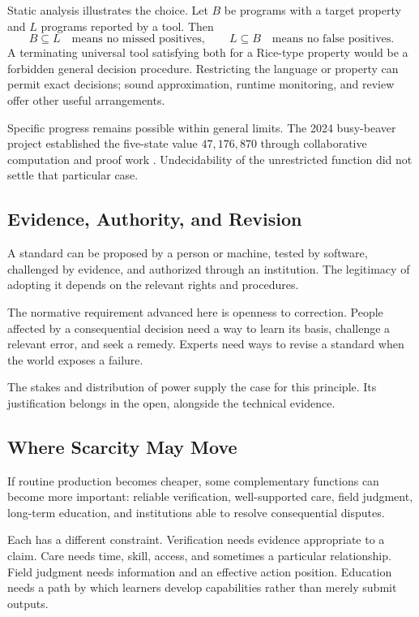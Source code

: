 \documentclass[11pt,openany]{book}
\begin{document}
Static analysis illustrates the choice. Let $B$ be programs with a target property and $L$ programs reported by a tool. Then
\begin{equation}
 B\subseteq L\quad\text{means no missed positives},
 \qquad
 L\subseteq B\quad\text{means no false positives}.
\end{equation}
A terminating universal tool satisfying both for a Rice-type property would be a forbidden general decision procedure. Restricting the language or property can permit exact decisions; sound approximation, runtime monitoring, and review offer other useful arrangements.

Specific progress remains possible within general limits. The 2024 busy-beaver project established the five-state value $47{,}176{,}870$ through collaborative computation and proof work \cite{bbchallenge2024}. Undecidability of the unrestricted function did not settle that particular case.

\subsection{Evidence, Authority, and Revision}

A standard can be proposed by a person or machine, tested by software, challenged by evidence, and authorized through an institution. The legitimacy of adopting it depends on the relevant rights and procedures.

The normative requirement advanced here is openness to correction. People affected by a consequential decision need a way to learn its basis, challenge a relevant error, and seek a remedy. Experts need ways to revise a standard when the world exposes a failure.

The stakes and distribution of power supply the case for this principle. Its justification belongs in the open, alongside the technical evidence.

\subsection{Where Scarcity May Move}

If routine production becomes cheaper, some complementary functions can become more important: reliable verification, well-supported care, field judgment, long-term education, and institutions able to resolve consequential disputes.

Each has a different constraint. Verification needs evidence appropriate to a claim. Care needs time, skill, access, and sometimes a particular relationship. Field judgment needs information and an effective action position. Education needs a path by which learners develop capabilities rather than merely submit outputs.
\end{document}
